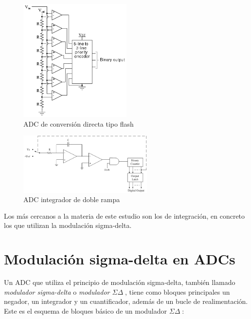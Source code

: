 \documentclass[12pt]{report} %
\newcommand{\sigmadelta}{$\Sigma\Delta\; $}
\begin{document}
	\begin{figure}[H]
		\includegraphics[width=0.5\textwidth]{flash-adc.png}
		\caption[ADC de conversión directa tipo flash]{ADC de conversión directa tipo flash\protect\footnotemark}
		\label{fig:flash-adc.png}
	\end{figure}
	\begin{figure}[H]
		\includegraphics[width=0.6\textwidth]{integrator-adc-double-ramp.png}
		\caption[ADC integrador de doble rampa]{ADC integrador de doble rampa\protect\footnotemark}
		\label{fig:integrator-adc-double-ramp.png}
	\end{figure}
	
	Los más cercanos a la materia de este estudio son los de integración, en concreto los que utilizan la modulación sigma-delta.
	
	\section{Modulación sigma-delta en ADCs}
	
	Un ADC que utiliza el principio de modulación sigma-delta, también llamado \textit{modulador sigma-delta} o \textit{modulador \sigmadelta}, tiene como bloques principales un negador, un integrador y un cuantificador, además de un bucle de realimentación. Este es el esquema de bloques básico de un modulador \sigmadelta:
	
\end{document}
